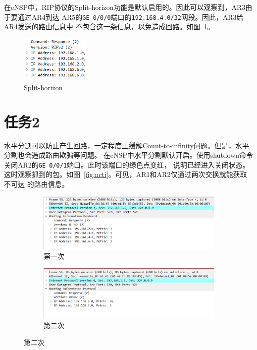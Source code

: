 \documentclass[a4paper,twoside]{article}
\begin{document}
\begin{spacing}{1.2}
在eNSP中，RIP协议的Split-horizon功能是默认启用的。因此可以观察到，AR3由于要通过AR4到达
AR5的\texttt{GE 0/0/0}端口的\texttt{192.168.4.0/32}网段。因此，AR3给AR4发送的路由信息中
不包含这一条信息，以免造成回路。如图~\ref{fig:ar3rip}。
\begin{figure}[htb]
	\centering
	\caption{Split-horizon}
	\label{fig:ar3rip}
	\includegraphics[width=0.3\textwidth]{sh.png} 
\end{figure}

\section{任务2}

水平分割可以防止产生回路，一定程度上缓解Count-to-infinity问题。但是，水平分割也会造成路由欺骗等问题。
在eNSP中水平分割默认开启。使用shutdown命令关闭AR2的\texttt{GE 0/0/1}端口。此时该端口的绿色点变红，
说明已经进入关闭状态。这时观察抓到的包。如图~\ref{fig:ncti}。可见，AR1和AR2仅通过两次交换就能获取不可达
的路由信息。
\begin{figure}[htbp]
	\centering
	\caption{关闭AR2后的路由信息}
	\label{fig:ncti}
	\begin{subfigure}{0.4\textwidth}
		\centering
		\includegraphics[width=\textwidth]{s1.png}
		\caption{第一次}
		\label{fig:ncti1}
	\end{subfigure}
	\begin{subfigure}{0.4\textwidth}
		\centering
		\includegraphics[width=\textwidth]{s16.png}
		\caption{第二次}
		\label{fig:ncti2}
	\end{subfigure}
\end{figure}


\end{spacing}
\end{document}
